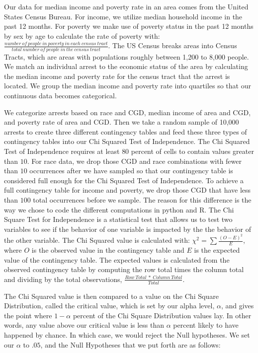 \documentclass{article}
\begin{document}
Our data for median income and poverty rate in an area comes from the United States Census Bureau. For income, we utilize median household income in the past 12 months. For poverty we make use of poverty status in the past 12 months by sex by age to calculate the rate of poverty with: 
$ \frac{number\ of\ people\ in\ poverty\ in \ each \ census \ tract}{total\ number\ of\ people\ in\ the\ census\ tract}$. The US Census breaks areas into Census Tracts, which are areas with populations roughly between 1,200 to 8,000 people. We match an individual arrest to the economic status of the area by calculating the median income and poverty rate for the census tract that the arrest is located. We group the median income and poverty rate into quartiles so that our continuous data becomes categorical. 

We categorize arrests based on race and CGD, median income of area and CGD, and poverty rate of area and CGD. Then we take a random sample of 10,000 arrests to create three different contingency tables and feed these three types of contingency tables into our Chi Squared Test of Independence. The Chi Squared Test of Independence requires at least $80$ percent of cells to contain values greater than $10$. For race data, we drop those CGD and race combinations with fewer than $10$ occurrences after we have sampled so that our contingency table is considered full enough for the Chi Squared Test of Independence. To achieve a full contingency table for income and poverty, we drop those CGD that have less than $100$ total occurrences before we sample. The reason for this difference is the way we chose to code the different computations in python and R. The Chi Square Test for Independence is a statistical test that allows us to test two variables to see if the behavior of one variable is impacted by the the behavior of the other variable. The Chi Squared value is calculated with: $\chi^2 =\sum \frac{(O-E)^2}{E}$, where $O$ is the observed value in the contingency table and $E$ is the expected value of the contingency table. The expected values is calculated from the observed contingency table by computing the row total times the column total and dividing by the total observations, $\frac{Row\ Total\ *\ Column\ Total}{Total}$. 

The Chi Squared value is then compared to a value on the Chi Square Distribution, called the critical value, which is set by our alpha level, $\alpha$, and gives the point where $1 - \alpha$ percent of the Chi Square Distribution values lay. In other words, any value above our critical value is less than $\alpha$ percent likely to have happened by chance. In which case, we would reject the Null hypotheses. We set our $\alpha$ to $.05$, and the Null Hypotheses that we put forth are as follows: 
\end{document}
